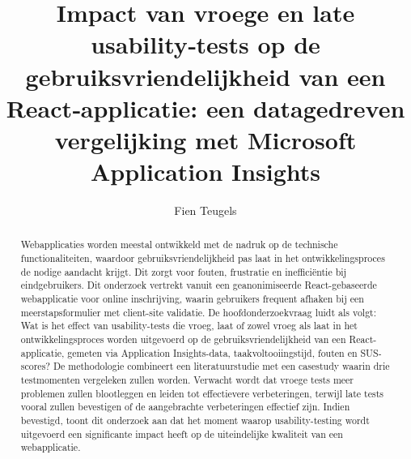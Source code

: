 \documentclass{hogent-article}
\title{Impact van vroege en late usability‑tests op de gebruiksvriendelijkheid van een React‑applicatie: een datagedreven vergelijking met Microsoft Application Insights}
\author{Fien Teugels}
\begin{document}
\begin{abstract}
  Webapplicaties worden meestal ontwikkeld met de nadruk op de technische functionaliteiten, waardoor gebruiksvriendelijkheid pas laat in het ontwikkelingsproces de nodige aandacht krijgt. Dit zorgt voor fouten, frustratie en inefficiëntie bij eindgebruikers. Dit onderzoek vertrekt vanuit een geanonimiseerde React-gebaseerde webapplicatie voor online inschrijving, waarin gebruikers frequent afhaken bij een meerstapsformulier met client-site validatie.
  De hoofdonderzoekvraag luidt als volgt: Wat is het effect van usability-tests die vroeg, laat of zowel vroeg als laat in het ontwikkelingsproces worden uitgevoerd op de gebruiksvriendelijkheid van een React-applicatie, gemeten via Application Insights-data, taakvoltooiingstijd, fouten en SUS-scores?
  De methodologie combineert een literatuurstudie met een casestudy waarin drie testmomenten vergeleken zullen worden. Verwacht wordt dat vroege tests meer problemen zullen blootleggen en leiden tot effectievere verbeteringen, terwijl late tests vooral zullen bevestigen of de aangebrachte verbeteringen effectief zijn. Indien bevestigd, toont dit onderzoek aan dat het moment waarop usability-testing wordt uitgevoerd een significante impact heeft op de uiteindelijke kwaliteit van een webapplicatie.
\end{abstract}

\tableofcontents



\printbibliography[heading=bibintoc]
\end{document}

